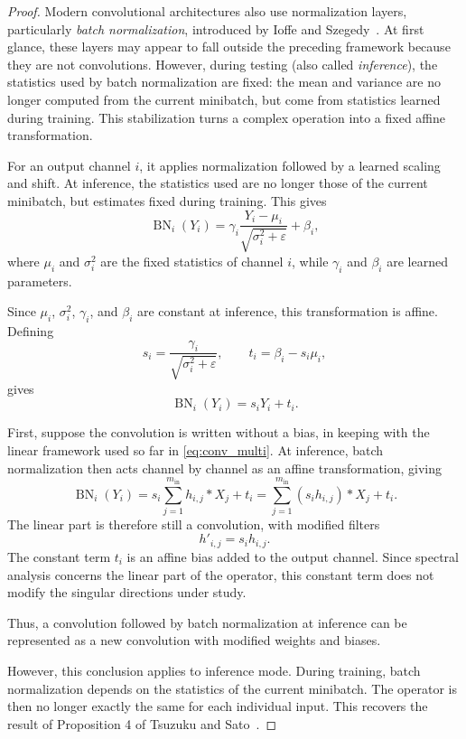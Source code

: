 \begin{proof}

Modern convolutional architectures also use normalization layers, particularly
\textit{batch normalization}, introduced by Ioffe and Szegedy~\cite{ioffe2015batch}. At first glance, these layers may appear to fall outside the preceding framework because they
are not convolutions. However, during testing (also called \textit{inference}), the statistics used by batch normalization are
fixed: the mean and variance are no longer computed from the current minibatch, but come from
statistics learned during training.
This stabilization turns a complex operation into a fixed affine transformation.

For an output channel $i$, it applies normalization followed by a learned
scaling and shift. At inference, the statistics used are no longer
those of the current minibatch, but estimates fixed during training. This
gives
\[
\operatorname{BN}_i(Y_i)
=
\gamma_i \frac{Y_i - \mu_i}{\sqrt{\sigma_i^2+\varepsilon}} + \beta_i,
\]
where $\mu_i$ and $\sigma_i^2$ are the fixed statistics of channel $i$, while
$\gamma_i$ and $\beta_i$ are learned parameters.

Since $\mu_i$, $\sigma_i^2$, $\gamma_i$, and $\beta_i$ are constant at inference, this
transformation is affine. Defining
\[
s_i = \frac{\gamma_i}{\sqrt{\sigma_i^2+\varepsilon}},
\qquad
t_i = \beta_i - s_i\mu_i,
\]
gives
\[
\operatorname{BN}_i(Y_i) = s_iY_i + t_i.
\]

First, suppose the convolution is written without a bias, in keeping with the linear framework used
so far in \eqref{eq:conv_multi}. At inference, batch normalization then acts channel by channel
as an affine transformation, giving
\[
\operatorname{BN}_i(Y_i)
=
s_i \sum_{j=1}^{m_{\mathrm{in}}} h_{i,j} * X_j + t_i
=
\sum_{j=1}^{m_{\mathrm{in}}} (s_i h_{i,j}) * X_j + t_i.
\]
The linear part is therefore still a convolution, with modified filters
\[
h'_{i,j}=s_i h_{i,j}.
\]
The constant term $t_i$ is an affine bias added to the output channel.
Since spectral analysis concerns the linear part of the operator, this constant term does not modify the
singular directions under study.

Thus, a convolution followed by batch normalization at inference can be represented as a new
convolution with modified weights and biases.

However, this conclusion applies to inference mode. During training, batch
normalization depends on the statistics of the current minibatch. The operator is then no longer exactly the same
for each individual input. This recovers the result of Proposition 4 of Tsuzuku and Sato~\cite{tsuzuku2019structural}.

\end{proof}


